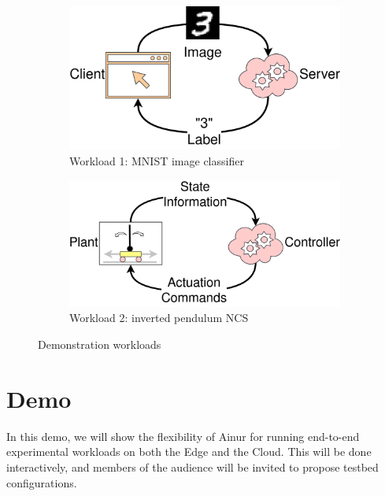 \begin{figure}
    \centering
    \begin{subfigure}{.45\textwidth}
        \centering
        \includegraphics[width=.9\textwidth]{publications/2022Ainur/figures/demo_workload_1}
        \caption{Workload 1: \acs{MNIST} image classifier}\label{paper:olguinmunoz2022airnur:fig:wkld:mnist}
    \end{subfigure}%
    \hfill%
    \begin{subfigure}{.45\textwidth}
        \centering
        \includegraphics[width=.9\textwidth]{publications/2022Ainur/figures/demo_workload_2}
        \caption{Workload 2: inverted pendulum \acs{NCS}}\label{paper:olguinmunoz2022airnur:fig:wkld:ncs}
    \end{subfigure}
    \caption{Demonstration workloads}\label{paper:olguinmunoz2022airnur:fig:wkld}
\end{figure}

\section{Demo}\label{paper:olguinmunoz2022airnur:demo}

In this demo, we will show the flexibility of Ainur for running end-to-end experimental workloads on both the Edge and the Cloud.
This will be done interactively, and members of the audience will be invited to propose testbed configurations.

